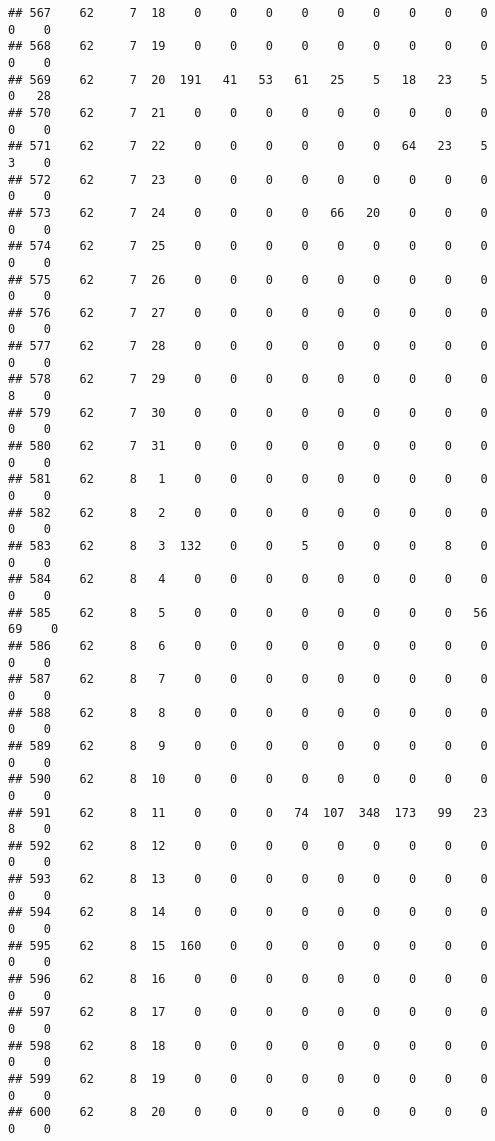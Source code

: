 \documentclass[]{article}
\begin{document}
\begin{verbatim}
## 567    62     7  18    0    0    0    0    0    0    0    0    0    0    0
## 568    62     7  19    0    0    0    0    0    0    0    0    0    0    0
## 569    62     7  20  191   41   53   61   25    5   18   23    5    0   28
## 570    62     7  21    0    0    0    0    0    0    0    0    0    0    0
## 571    62     7  22    0    0    0    0    0    0   64   23    5    3    0
## 572    62     7  23    0    0    0    0    0    0    0    0    0    0    0
## 573    62     7  24    0    0    0    0   66   20    0    0    0    0    0
## 574    62     7  25    0    0    0    0    0    0    0    0    0    0    0
## 575    62     7  26    0    0    0    0    0    0    0    0    0    0    0
## 576    62     7  27    0    0    0    0    0    0    0    0    0    0    0
## 577    62     7  28    0    0    0    0    0    0    0    0    0    0    0
## 578    62     7  29    0    0    0    0    0    0    0    0    0    8    0
## 579    62     7  30    0    0    0    0    0    0    0    0    0    0    0
## 580    62     7  31    0    0    0    0    0    0    0    0    0    0    0
## 581    62     8   1    0    0    0    0    0    0    0    0    0    0    0
## 582    62     8   2    0    0    0    0    0    0    0    0    0    0    0
## 583    62     8   3  132    0    0    5    0    0    0    8    0    0    0
## 584    62     8   4    0    0    0    0    0    0    0    0    0    0    0
## 585    62     8   5    0    0    0    0    0    0    0    0   56   69    0
## 586    62     8   6    0    0    0    0    0    0    0    0    0    0    0
## 587    62     8   7    0    0    0    0    0    0    0    0    0    0    0
## 588    62     8   8    0    0    0    0    0    0    0    0    0    0    0
## 589    62     8   9    0    0    0    0    0    0    0    0    0    0    0
## 590    62     8  10    0    0    0    0    0    0    0    0    0    0    0
## 591    62     8  11    0    0    0   74  107  348  173   99   23    8    0
## 592    62     8  12    0    0    0    0    0    0    0    0    0    0    0
## 593    62     8  13    0    0    0    0    0    0    0    0    0    0    0
## 594    62     8  14    0    0    0    0    0    0    0    0    0    0    0
## 595    62     8  15  160    0    0    0    0    0    0    0    0    0    0
## 596    62     8  16    0    0    0    0    0    0    0    0    0    0    0
## 597    62     8  17    0    0    0    0    0    0    0    0    0    0    0
## 598    62     8  18    0    0    0    0    0    0    0    0    0    0    0
## 599    62     8  19    0    0    0    0    0    0    0    0    0    0    0
## 600    62     8  20    0    0    0    0    0    0    0    0    0    0    0

\end{verbatim}
\end{document}
